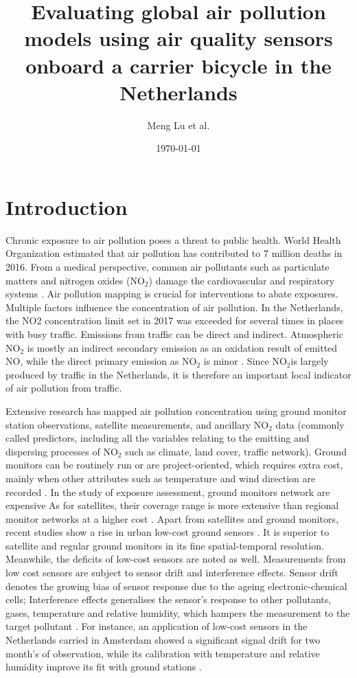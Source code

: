\documentclass{article}
\title{Evaluating global air pollution models using air quality sensors onboard a carrier bicycle in the Netherlands}
\author{Meng Lu et al. }
\date{\today}
\begin{document}
\maketitle

\section{Introduction}
Chronic exposure to air pollution poses a threat to public health. World Health Organization estimated that air pollution has contributed to 7 million deaths in 2016\citep{world2018burden}. From a medical perspective, common air pollutants such as particulate matters and nitrogen oxides (NO$_2$) damage the cardiovascular and respiratory systems \citep{anderson2012clearing, pascal2009effets}. Air pollution mapping is crucial for interventions to abate exposures. Multiple factors influence the concentration of air pollution. In the Netherlands, the NO2 concentration limit set in 2017 was exceeded for several times in places with busy traffic\citep{no2}. Emissions from traffic can be direct and indirect. Atmospheric NO$_2$ is mostly an indirect secondary emission as an oxidation result of emitted NO, while the direct primary emission as NO$_2$ is minor \citep{ukno2}. Since NO$_2$is largely produced by traffic in the Netherlands, it is therefore an important local indicator of air pollution from traffic\citep{no2}.
\par
Extensive research has mapped air pollution concentration using ground monitor station observations, satellite measurements, and ancillary NO$_2$ data (commonly called predictors, including all the variables relating to the emitting and dispersing processes of NO$_2$ such as climate, land cover, traffic network)\citep{rivera2013nitrogen, park2017individual,kharol2015assessment, isiugo2018assessing}. Ground monitors can be routinely run or are project-oriented, which requires extra cost, mainly when other attributes such as temperature and wind direction are recorded \citep{hoek2008review}. In the study of exposure assessment, ground monitors network are expensive As for satellites, their coverage range is more extensive than regional monitor networks at a higher cost \citep{hoek2008review}.  Apart from satellites and ground monitors, recent studies show a rise in urban low-cost ground sensors \citep{spinelle2015field, schneider2017mapping,isiugo2018assessing}. It is superior to satellite and regular ground monitors in its fine spatial-temporal resolution. Meanwhile, the deficits of low-cost sensors are noted as well. Measurements from low cost sensors are subject to sensor drift and interference effects. Sensor drift denotes the growing bias of sensor response due to the ageing electronic-chemical cells; Interference effects generalises the sensor's response to other pollutants, gases, temperature and relative humidity, which hampers the measurement to the target pollutant \citep{van2019calibration}. For instance, an application of low-cost sensors in the Netherlands carried in Amsterdam showed a significant signal drift for two month's of observation, while its calibration with temperature and relative humidity improve its fit with ground stations \citep{mijling2018field}.
 
\end{document}
